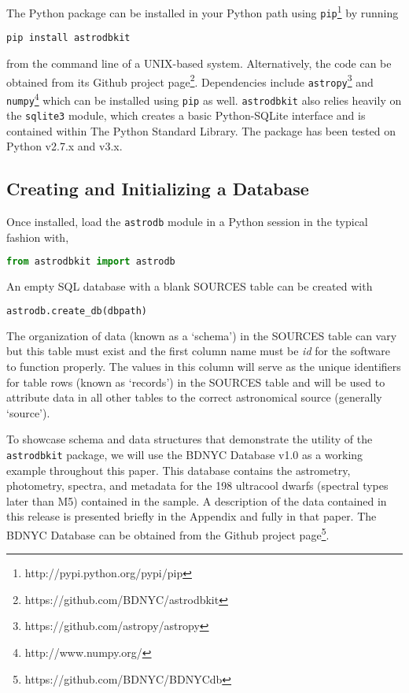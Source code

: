 \documentclass[iop,revtex4,natbib209]{emulateapj}
\begin{document}
The Python package can be installed in your Python path using \texttt{pip}\footnote{http://pypi.python.org/pypi/pip} by running 

\begin{lstlisting}
pip install astrodbkit
\end{lstlisting}

from the command line of a UNIX-based system. Alternatively, the code can be obtained from its Github project page\footnote{https://github.com/BDNYC/astrodbkit}. Dependencies include \texttt{astropy}\footnote{https://github.com/astropy/astropy} \citep{astr13} and \texttt{numpy}\footnote{http://www.numpy.org/} which can be installed using \texttt{pip} as well. \texttt{astrodbkit} also relies heavily on the \texttt{sqlite3} module, which creates a basic Python-SQLite interface and is contained within The Python Standard Library. The package has been tested on Python v2.7.x and v3.x.

\subsection{Creating and Initializing a Database}{\label{sec:initialize}}
Once installed, load the \texttt{astrodb} module in a Python session in the typical fashion with,

\begin{lstlisting}[language=Python]
from astrodbkit import astrodb
\end{lstlisting}

An empty SQL database with a blank SOURCES table can be created with 

\begin{lstlisting}[language=Python]
astrodb.create_db(dbpath)
\end{lstlisting}

The organization of data (known as a `schema') in the SOURCES table can vary but this table must exist and the first column name must be \textit{id} for the software to function properly. The values in this column will serve as the unique identifiers for table rows (known as `records') in the SOURCES table and will be used to attribute data in all other tables to the correct astronomical source (generally `source').

To showcase schema and data structures that demonstrate the utility of the \texttt{astrodbkit} package, we will use the BDNYC Database v1.0 \citep{Fili16} as a working example throughout this paper. This database contains the astrometry, photometry, spectra, and metadata for the 198 ultracool dwarfs (spectral types later than M5) contained in the \citet{Fili15} sample. A description of the data contained in this release is presented briefly in the Appendix and fully in that paper. The BDNYC Database can be obtained from the Github project page\footnote{https://github.com/BDNYC/BDNYCdb}.
\end{document}
